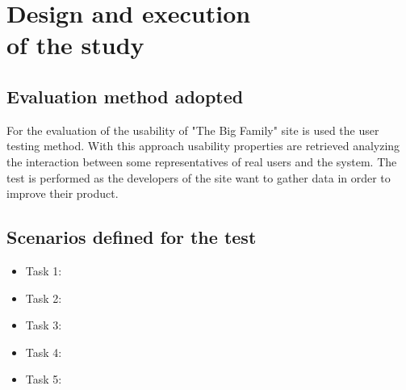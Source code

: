 %
%
\chapter{Design and execution\\of the study}
%
%
%
\section{Evaluation method adopted}
For the evaluation of the usability of "The Big Family" site is used the user testing method. With this approach usability properties are retrieved analyzing the interaction between some representatives of real users and the system. The test is performed as the developers of the site want to gather data in order to improve their product.
%
%
\section{Scenarios defined for the test}
\begin{itemize}
\item Task 1: 
\item Task 2:
\item Task 3:
\item Task 4:
\item Task 5:
\end{itemize}
%
%
